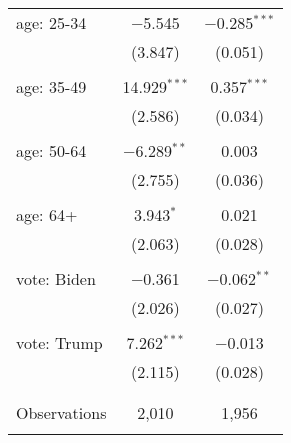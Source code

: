 \begin{tabular}{@{\extracolsep{5pt}}lcc}
 age: 25-34 & $-$5.545 & $-$0.285$^{***}$ \\ 
  & (3.847) & (0.051) \\ 
  & & \\ 
 age: 35-49 & 14.929$^{***}$ & 0.357$^{***}$ \\ 
  & (2.586) & (0.034) \\ 
  & & \\ 
 age: 50-64 & $-$6.289$^{**}$ & 0.003 \\ 
  & (2.755) & (0.036) \\ 
  & & \\ 
 age: 64+ & 3.943$^{*}$ & 0.021 \\ 
  & (2.063) & (0.028) \\ 
  & & \\ 
 vote: Biden & $-$0.361 & $-$0.062$^{**}$ \\ 
  & (2.026) & (0.027) \\ 
  & & \\ 
 vote: Trump & 7.262$^{***}$ & $-$0.013 \\ 
  & (2.115) & (0.028) \\ 
  & & \\ 
\hline \\[-1.8ex] 

Observations & 2,010 & 1,956 \\ 
\hline 
\hline \\[-1.8ex] 
\end{tabular} 